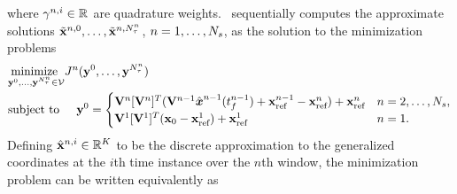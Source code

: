 where $\gamma^{n,i} \in \mathbb{R}^{}$ are quadrature weights. 
\methodAcronym\ sequentially computes the approximate solutions $\tilde{\mathbf{x}}^{n,0},\ldots,\tilde{\mathbf{x}}^{n,N_{\tau}^{n}}$, $n=1,\ldots,N_s$, as the solution to the minimization problems
\begin{align*}
&\underset{\mathbf{y}^{0},\ldots,\mathbf{y}^{N_{\tau}^{n}} \in \mathcal{V }}{\text{minimize } }
J_{}^{n} (\mathbf{y}^{0},\ldots,\mathbf{y}^{N_{\tau}^{n}}) \\
& \text{subject to} \hspace{0.2 in}  \mathbf{y}^{0} =
\begin{cases} \mathbf {V}^{n} [\mathbf {V}^{n}]^T(\mathbf {V}^{n-1} \hat{ \boldsymbol x}^{n-1}(t_f^{n-1} ) + \mathbf{x}_\text{ref}^{n-1} - \mathbf{x}_\text{ref}^{n} ) + \mathbf{x}_\text{ref}^{n}& n = 2,\ldots,N_s,\\
\mathbf {V}^{1} [\mathbf {V}^{1}]^T( {{\mathbf{x}}_0} - \mathbf{x}_\text{ref}^{1})  + \mathbf{x}_\text{ref}^{1}& n=1. \end{cases} \end{align*}
Defining $\hat{\mathbf{x}}^{n,i} \in \mathbb{R}^{K}$ to be the discrete approximation to the generalized coordinates at the $i$th time instance over the $n$th window, 
the minimization problem can be written equivalently as
